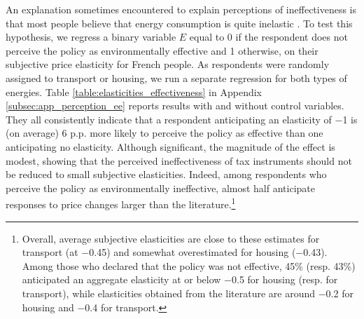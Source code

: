 \documentclass[12pt]{article} %
\begin{document}
An explanation sometimes encountered to explain perceptions of ineffectiveness is that most people believe that energy consumption is quite inelastic \citep{kallbekken_saelen_2011,carattini_overcoming_2018}. To test this hypothesis, we regress a binary variable $E$ equal to 0 if the respondent does not perceive the policy as environmentally effective and 1 otherwise, on their subjective price elasticity for French people. As respondents were randomly assigned to transport or housing, we run a separate regression for both types of energies. Table \ref{table:elasticities_effectiveness} in Appendix \ref{subsec:app_perception_ee} reports results with and without control variables. They all consistently indicate that a respondent anticipating an elasticity of $-$1 is (on average) 6 p.p. more likely to perceive the policy as effective than one anticipating no elasticity. Although significant, the magnitude of the effect is modest, showing that the perceived ineffectiveness of tax instruments should not be reduced to small subjective elasticities. Indeed, among respondents who perceive the policy as environmentally ineffective, almost half anticipate responses to price changes larger than the literature.\footnote{Overall, average subjective elasticities are close to these estimates for transport (at $-$0.45) and somewhat overestimated for housing ($-$0.43). Among those who declared that the policy was not effective, 45\% (resp. 43\%) anticipated an aggregate elasticity at or below $-$0.5 for housing (resp. for transport), while elasticities obtained from the literature are around $-$0.2 for housing and $-$0.4 for transport.\label{fnel}}

\end{document}
